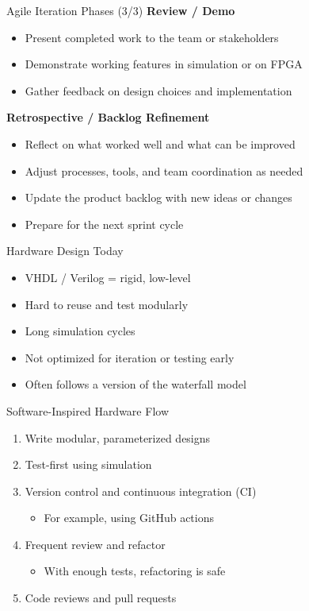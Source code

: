 \begin{frame}{Agile Iteration Phases (3/3)}
\textbf{Review / Demo}
\begin{itemize}
    \item Present completed work to the team or stakeholders
    \item Demonstrate working features in simulation or on FPGA
    \item Gather feedback on design choices and implementation
\end{itemize}

\medskip
\textbf{Retrospective / Backlog Refinement}
\begin{itemize}
    \item Reflect on what worked well and what can be improved
    \item Adjust processes, tools, and team coordination as needed
    \item Update the product backlog with new ideas or changes
    \item Prepare for the next sprint cycle
\end{itemize}
\end{frame}

\begin{frame}{Hardware Design Today}
\begin{itemize}
    \item VHDL / Verilog = rigid, low-level
    \item Hard to reuse and test modularly
    \item Long simulation cycles
    \item Not optimized for iteration or testing early
    \item Often follows a version of the waterfall model
\end{itemize}
\end{frame}

\begin{frame}{Software-Inspired Hardware Flow}
\begin{enumerate}
    \item Write modular, parameterized designs
    \item Test-first using simulation
    \item Version control and continuous integration (CI)
    \begin{itemize}
\item For example, using GitHub actions
\end{itemize}
    \item Frequent review and refactor
    \begin{itemize}
\item With enough tests, refactoring is safe
\end{itemize}
    \item Code reviews and pull requests
\end{enumerate}
\end{frame}


